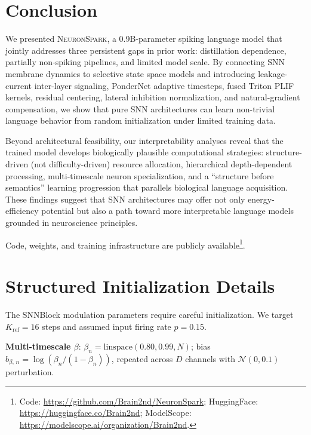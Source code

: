 \documentclass{article}
\newcommand{\model}{\textsc{NeuronSpark}}
\begin{document}
\section{Conclusion}
\label{sec:conclusion}

We presented \model{}, a 0.9B-parameter spiking language model that jointly addresses three persistent gaps in prior work: distillation dependence, partially non-spiking pipelines, and limited model scale.
By connecting SNN membrane dynamics to selective state space models and introducing leakage-current inter-layer signaling, PonderNet adaptive timesteps, fused Triton PLIF kernels, residual centering, lateral inhibition normalization, and natural-gradient compensation, we show that pure SNN architectures can learn non-trivial language behavior from random initialization under limited training data.

Beyond architectural feasibility, our interpretability analyses reveal that the trained model develops biologically plausible computational strategies: structure-driven (not difficulty-driven) resource allocation, hierarchical depth-dependent processing, multi-timescale neuron specialization, and a ``structure before semantics'' learning progression that parallels biological language acquisition.
These findings suggest that SNN architectures may offer not only energy-efficiency potential but also a path toward more interpretable language models grounded in neuroscience principles.

Code, weights, and training infrastructure are publicly available\footnote{Code: \url{https://github.com/Brain2nd/NeuronSpark}; HuggingFace: \url{https://huggingface.co/Brain2nd}; ModelScope: \url{https://modelscope.ai/organization/Brain2nd}.}.




\appendix

\section{Structured Initialization Details}
\label{app:init}

The SNNBlock modulation parameters require careful initialization.
We target $K_{\text{ref}} = 16$ steps and assumed input firing rate $p = 0.15$.

\textbf{Multi-timescale $\beta$}: $\beta_n = \text{linspace}(0.80, 0.99, N)$; bias $b_{\beta,\,n} = \log(\beta_n / (1 - \beta_n))$, repeated across $D$ channels with $\mathcal{N}(0, 0.1)$ perturbation.
\end{document}
